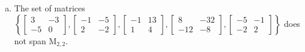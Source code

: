 \begin{exerciseAnswer}
\begin{enumerate}[(a)]
\begin{center}
\begin{minipage}{0.8\textwidth}
\[\begin{array}{cc}
-1 & -5 \\
2 & -2
\end{array}\right] + y_{3} \left[\begin{array}{cc}
-1 & 13 \\
1 & 4
\end{array}\right] + y_{4} \left[\begin{array}{cc}
8 & -32 \\
-12 & -8
\end{array}\right] + y_{5} \left[\begin{array}{cc}
-5 & -1 \\
-2 & 2
\end{array}\right] =B\] has a solution for every \(B \in \mathrm{M}_{2,2}\). 
\end{minipage}\end{center}
    
\item The set of matrices \( \left\{ \left[\begin{array}{cc}
3 & -3 \\
-5 & 0
\end{array}\right] , \left[\begin{array}{cc}
-1 & -5 \\
2 & -2
\end{array}\right] , \left[\begin{array}{cc}
-1 & 13 \\
1 & 4
\end{array}\right] , \left[\begin{array}{cc}
8 & -32 \\
-12 & -8
\end{array}\right] , \left[\begin{array}{cc}
-5 & -1 \\
-2 & 2
\end{array}\right] \right\} \) does not span \(\mathrm{M}_{2,2}\). 
\end{enumerate}
    
\end{exerciseAnswer}
    
